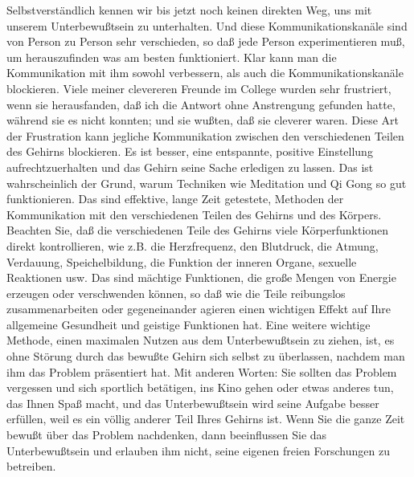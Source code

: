 Selbstverständlich kennen wir bis jetzt noch keinen direkten Weg, uns mit unserem Unterbewußtsein zu unterhalten.
 Und diese Kommunikationskanäle sind von Person zu Person sehr verschieden, so daß jede Person experimentieren muß, um herauszufinden was am besten funktioniert.
 Klar kann man die Kommunikation mit ihm sowohl verbessern, als auch die Kommunikationskanäle blockieren.
 Viele meiner clevereren Freunde im College wurden sehr frustriert, wenn sie herausfanden, daß ich die Antwort ohne Anstrengung gefunden hatte, während sie es nicht konnten; und sie wußten, daß sie cleverer waren.
 Diese Art der Frustration kann jegliche Kommunikation zwischen den verschiedenen Teilen des Gehirns blockieren.
 Es ist besser, eine entspannte, positive Einstellung aufrechtzuerhalten und das Gehirn seine Sache erledigen zu lassen.
 Das ist wahrscheinlich der Grund, warum Techniken wie Meditation und Qi Gong so gut funktionieren.
 Das sind effektive, lange Zeit getestete, Methoden der Kommunikation mit den verschiedenen Teilen des Gehirns und des Körpers.
 Beachten Sie, daß die verschiedenen Teile des Gehirns viele Körperfunktionen direkt kontrollieren, wie z.B. die Herzfrequenz, den Blutdruck, die Atmung, Verdauung, Speichelbildung, die Funktion der inneren Organe, sexuelle Reaktionen usw.
 Das sind mächtige Funktionen, die große Mengen von Energie erzeugen oder verschwenden können, so daß wie die Teile reibungslos zusammenarbeiten oder gegeneinander agieren einen wichtigen Effekt auf Ihre allgemeine Gesundheit und geistige Funktionen hat.
 Eine weitere wichtige Methode, einen maximalen Nutzen aus dem Unterbewußtsein zu ziehen, ist, es ohne Störung durch das bewußte Gehirn sich selbst zu überlassen, nachdem man ihm das Problem präsentiert hat.
 Mit anderen Worten: Sie sollten das Problem vergessen und sich sportlich betätigen, ins Kino gehen oder etwas anderes tun, das Ihnen Spaß macht, und das Unterbewußtsein wird seine Aufgabe besser erfüllen, weil es ein völlig anderer Teil Ihres Gehirns ist.
 Wenn Sie die ganze Zeit bewußt über das Problem nachdenken, dann beeinflussen Sie das Unterbewußtsein und erlauben ihm nicht, seine eigenen freien Forschungen zu betreiben.
 

